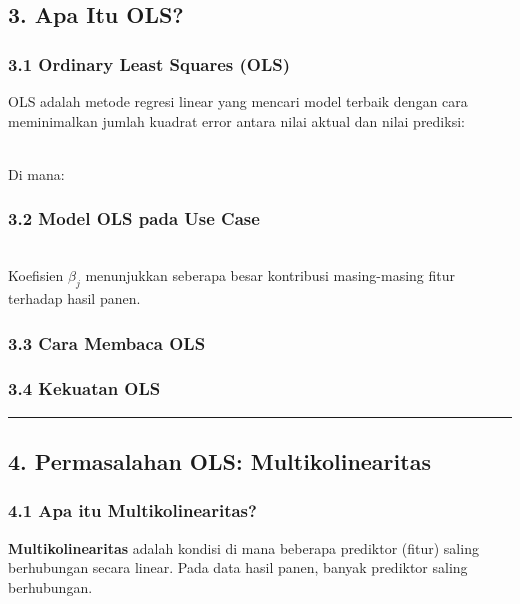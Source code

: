 \documentclass[12pt,a4paper]{article}
\begin{document}
\subsection{3. Apa Itu OLS?}

\subsubsection{3.1 Ordinary Least Squares (OLS)}

OLS adalah metode regresi linear yang mencari model terbaik dengan cara meminimalkan jumlah kuadrat error antara nilai aktual dan nilai prediksi:


\\[
\min_{\beta} \sum_{i=1}^{n} (y_i - \hat{y}_i)^2
\\]


Di mana:


\subsubsection{3.2 Model OLS pada Use Case}

\\[
\text{yield} = \beta_0 + \beta_1(\text{rainfall}) + \beta_2(\text{temperature}) + \dots + \beta_p(\text{pest index})
\\]


Koefisien $\beta_j$ menunjukkan seberapa besar kontribusi masing-masing fitur terhadap hasil panen.


\subsubsection{3.3 Cara Membaca OLS}


\subsubsection{3.4 Kekuatan OLS}


\hrule


\subsection{4. Permasalahan OLS: Multikolinearitas}

\subsubsection{4.1 Apa itu Multikolinearitas?}

\textbf{Multikolinearitas} adalah kondisi di mana beberapa prediktor (fitur) saling berhubungan secara linear. Pada data hasil panen, banyak prediktor saling berhubungan.
\end{document}
